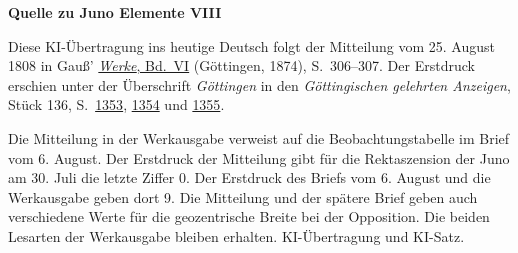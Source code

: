\clearpage\thispagestyle{empty}
\begin{center}\textbf{Quelle zu Juno Elemente VIII}\end{center}
\noindent Diese KI-Übertragung ins heutige Deutsch folgt der Mitteilung vom 25. August 1808 in Gauß’ \href{https://gdz.sub.uni-goettingen.de/id/PPN236007467}{\textit{Werke}, Bd.~VI} (Göttingen, 1874), S.~306--307. Der Erstdruck erschien unter der Überschrift \textit{Göttingen} in den \textit{Göttingischen gelehrten Anzeigen}, Stück 136, S.~\href{https://manifests.sub.uni-goettingen.de/iiif/image/gdz:PPN319721507_1808:00001359/full/1600,/0/default.jpg}{1353}, \href{https://manifests.sub.uni-goettingen.de/iiif/image/gdz:PPN319721507_1808:00001360/full/1600,/0/default.jpg}{1354} und \href{https://manifests.sub.uni-goettingen.de/iiif/image/gdz:PPN319721507_1808:00001361/full/1600,/0/default.jpg}{1355}.
\par\medskip
Die Mitteilung in der Werkausgabe verweist auf die Beobachtungstabelle im Brief vom 6. August. Der Erstdruck der Mitteilung gibt für die Rektaszension der Juno am 30. Juli die letzte Ziffer 0. Der Erstdruck des Briefs vom 6. August und die Werkausgabe geben dort 9. Die Mitteilung und der spätere Brief geben auch verschiedene Werte für die geozentrische Breite bei der Opposition. Die beiden Lesarten der Werkausgabe bleiben erhalten. KI-Übertragung und KI-Satz.
\clearpage
